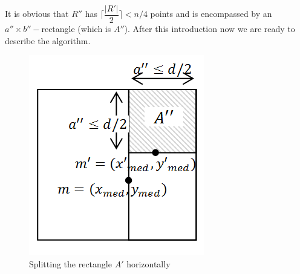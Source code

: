\documentclass{cccg12}
\begin{document}
It is obvious that $R''$ has ${ \big\lceil\dfrac{|R'|}{2}\big\rceil < n/4 }$ points and is encompassed by an ${ a'' \times b''- }$rectangle (which is $A''$).
After this introduction now we are ready to describe the algorithm.
\begin{figure} [h]
  \centering
  \includegraphics[scale=.5]{Figs/fig5.png}
  \caption{Splitting the rectangle $A'$ horizontally}
  \label{fig:split A'}
\end{figure}
\end{document}
